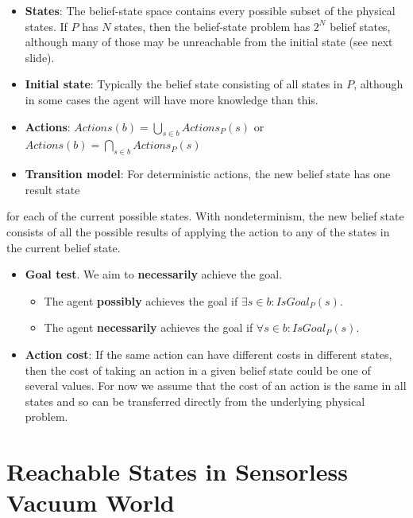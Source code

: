 \documentclass[11pt]{article}
\begin{document}
\begin{itemize}
\item \textbf{States}: The belief-state space contains every possible subset of the physical states. If \(P\) has \(N\) states, then the belief-state problem has \(2^N\) belief states, although many of those may be unreachable from the initial state (see next slide).

\item \textbf{Initial state}: Typically the belief state consisting of all states in \(P\), although in some cases the agent will have more knowledge than this.

\item \textbf{Actions}: \(Actions(b) = \bigcup_{s \in b} Actions_P(s)\) or \(Actions(b) = \bigcap_{s \in b} Actions_P(s)\)

\item \textbf{Transition model}: For deterministic actions, the new belief state has one result state
\end{itemize}
for each of the current possible states.  With nondeterminism, the new belief state consists of all the possible results of applying the action to any of the states in the current belief state.

\begin{itemize}
\item \textbf{Goal test}.  We aim to \textbf{necessarily} achieve the goal.

\begin{itemize}
\item The agent \textbf{possibly} achieves the goal if \(\exists s \in b : IsGoal_P(s)\).
\item The agent \textbf{necessarily} achieves the goal if \(\forall s \in b : IsGoal_P(s)\).
\end{itemize}

\item \textbf{Action cost}: If the same action can have different costs in different states, then the cost of taking an action in a given belief state could be one of several values. For now we assume that the cost of an action is the same in all states and so can be transferred directly from the underlying physical problem.
\end{itemize}
\section{Reachable States in Sensorless Vacuum World}
\label{sec:orgf7c8727}
\end{document}
